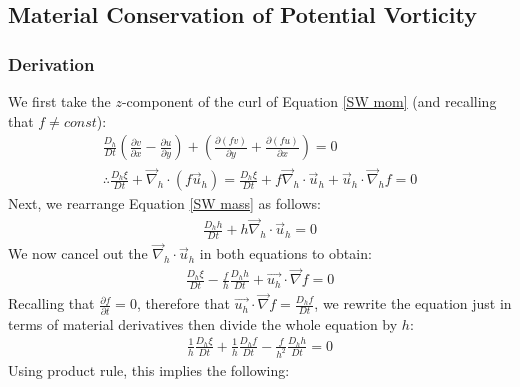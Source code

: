 \subsection{Material Conservation of Potential Vorticity}

\subsubsection{Derivation}

We first take the \(z\)-component of the curl of Equation \ref{SW mom} (and recalling that \(f\neq const\)):
\begin{align*}
    \frac{D_h}{Dt}\left( \frac{\partial v}{\partial x}- \frac{\partial u}{\partial y}\right) + \left( \frac{\partial (fv)}{\partial y} + \frac{\partial (fu)}{\partial x}\right) = 0
    \\
    \therefore \frac{D_h \xi}{Dt} + \vec{\nabla}_h \cdot \left( f\vec{u}_h \right)= \frac{D_h \xi}{Dt} + f\vec{\nabla}_h \cdot\vec{u}_h + \vec{u}_h \cdot \vec{\nabla}_h f = 0
\end{align*}
Next, we rearrange Equation \ref{SW mass} as follows:
\begin{align*}
    \frac{D_h h}{Dt}+h\vec{\nabla}_h \cdot \vec{u}_h=0
\end{align*}
We now cancel out the \(\vec{\nabla}_h\cdot \vec{u}_h\) in both equations to obtain:
\begin{align*}
    \frac{D_h \xi}{Dt} - \frac{f}{h}\frac{D_h h}{Dt} + \vec{u_h}\cdot\vec{\nabla}f = 0
\end{align*}
Recalling that \(\frac{\partial f}{\partial t}=0\), therefore that \(\vec{u_h}\cdot\vec{\nabla}f=\frac{D_h f}{Dt}\), we rewrite the equation just in terms of material derivatives then divide the whole equation by \(h\):
\begin{align*}
    \frac{1}{h}\frac{D_h \xi}{Dt} +\frac{1}{h}\frac{D_h f}{Dt} - \frac{f}{h^2}\frac{D_h h}{Dt}=0
\end{align*}
Using product rule, this implies the following:

